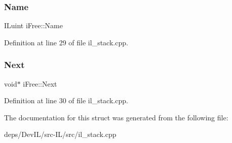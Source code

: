 \subsubsection{\texorpdfstring{Name}{Name}}
{\footnotesize\ttfamily I\+Luint i\+Free\+::\+Name}



Definition at line 29 of file il\+\_\+stack.\+cpp.

\mbox{\label{structiFree_a782f2d0256158d866cb315b5ac748e13}} 
\subsubsection{\texorpdfstring{Next}{Next}}
{\footnotesize\ttfamily void$\ast$ i\+Free\+::\+Next}



Definition at line 30 of file il\+\_\+stack.\+cpp.



The documentation for this struct was generated from the following file\+:\begin{DoxyCompactItemize}
\item 
deps/\+Dev\+I\+L/src-\/\+I\+L/src/il\+\_\+stack.\+cpp\end{DoxyCompactItemize}
